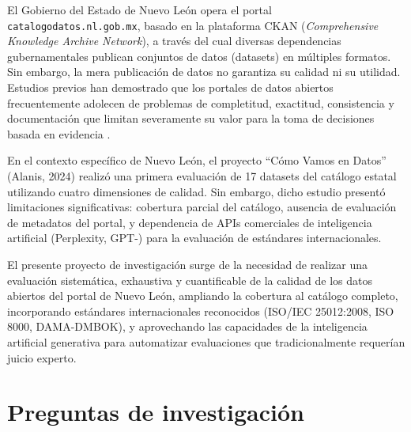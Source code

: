 \documentclass[12pt,letterpaper]{article}
\begin{document}
El Gobierno del Estado de Nuevo León opera el portal \texttt{catalogodatos.nl.gob.mx}, basado en la plataforma CKAN (\textit{Comprehensive Knowledge Archive Network}), a través del cual diversas dependencias gubernamentales publican conjuntos de datos (datasets) en múltiples formatos. Sin embargo, la mera publicación de datos no garantiza su calidad ni su utilidad. Estudios previos han demostrado que los portales de datos abiertos frecuentemente adolecen de problemas de completitud, exactitud, consistencia y documentación que limitan severamente su valor para la toma de decisiones basada en evidencia \parencite{vetro2016,neumaier2016}.

En el contexto específico de Nuevo León, el proyecto ``Cómo Vamos en Datos'' (Alanis, 2024) realizó una primera evaluación de 17 datasets del catálogo estatal utilizando cuatro dimensiones de calidad. Sin embargo, dicho estudio presentó limitaciones significativas: cobertura parcial del catálogo, ausencia de evaluación de metadatos del portal, y dependencia de APIs comerciales de inteligencia artificial (Perplexity, GPT-) para la evaluación de estándares internacionales.

El presente proyecto de investigación surge de la necesidad de realizar una evaluación sistemática, exhaustiva y cuantificable de la calidad de los datos abiertos del portal de Nuevo León, ampliando la cobertura al catálogo completo, incorporando estándares internacionales reconocidos (ISO/IEC 25012:2008, ISO 8000, DAMA-DMBOK), y aprovechando las capacidades de la inteligencia artificial generativa para automatizar evaluaciones que tradicionalmente requerían juicio experto.

\section{Preguntas de investigación}
\end{document}

